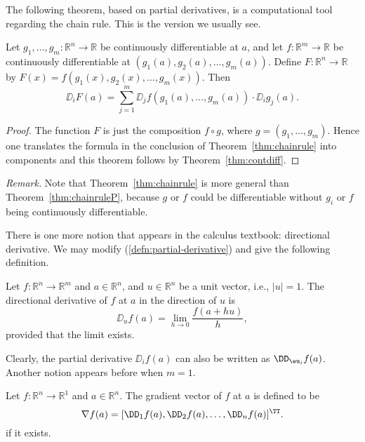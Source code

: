 \documentclass[11pt]{article}
\begin{document}
The following theorem, based on partial derivatives, is a
computational tool regarding the chain rule.  This is the version we
usually see.

\begin{thm}
  \label{thm:chainruleP}
  Let $g_1, \dots, g_m : \mathbb{R}^n \rightarrow \mathbb{R}$ be continuously
  differentiable at $a$, and let $f : \mathbb{R}^m \rightarrow \mathbb{R}$ be
  continuously differentiable at $(g_1(a), g_2(a), \dots, g_m(a))$.
  Define $F: \mathbb{R}^n \rightarrow \mathbb{R}$ by $F(x) = f(g_1(x), g_2(x),
  \dots, g_m(x))$.  Then
  \begin{equation*}
    \DD_i F(a) = \sum_{j=1}^m \DD_j f(g_1(a), \dots, g_m(a)) \cdot \DD_i
    g_j(a).
  \end{equation*}
\end{thm}

\begin{proof}
The function $F$ is just the composition $f \circ g$, where $g
= (g_1, \dots, g_m)$.  Hence one translates the formula in the
conclusion of Theorem~\ref{thm:chainrule} into components and this
theorem follows by Theorem~\ref{thm:contdiff}.
\end{proof}

\noindent\textit{Remark.} Note that Theorem~\ref{thm:chainrule} is more general than Theorem~\ref{thm:chainruleP}, because $g$ or $f$ could be
differentiable without $g_i$ or $f$ being continuously differentiable.

There is one more notion that appears in the calculus textbook: directional derivative.
We may modify (\ref{defn:partial-derivative}) and give the following definition.

\begin{defn}
  Let $f : \mathbb{R}^n \to \mathbb{R}^m$ and $a \in \mathbb{R}^n$, and $u \in \mathbb{R}^n$ be a unit vector, i.e., $|u| = 1$.
  The \textsf{directional derivative} of $f$ at $a$ in the direction of $u$ is
  \[
    \DD_u f(a) = \lim_{h \to 0} \frac{ f(a + hu) }{ h },
  \]
  provided that the limit exists.
\end{defn}

Clearly, the partial derivative $\DD_i f(a)$ can also be written as $\DD_{\eu_i} f(a)$.
Another notion appears before when $m = 1$.

\begin{defn}
  \label{defn:gradient}
  Let $f : \mathbb{R}^n \to \mathbb{R}^1$ and $a \in \mathbb{R}^n$.
  The \textsf{gradient vector} of $f$ at $a$ is defined to be
  \[
    \nabla f(a) = [\DD_1 f(a), \DD_2 f(a), \dots, \DD_n f(a)]^\TT.
  \]
  if it exists.
\end{defn}
\end{document}
